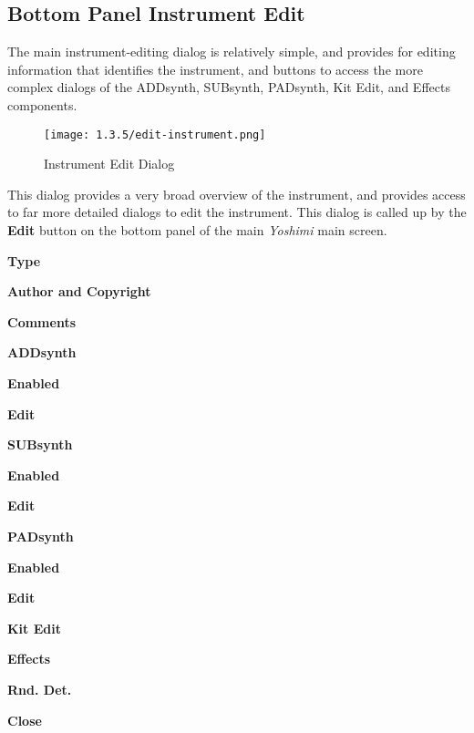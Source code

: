 \subsection{Bottom Panel Instrument Edit}
\label{subsec:bottom_panel_instrument_edit}

   The main instrument-editing dialog is relatively simple, and provides for
   editing information that identifies the instrument, and buttons to access
   the more complex dialogs of the ADDsynth, SUBsynth, PADsynth, Kit Edit,
   and Effects components.


\begin{figure}[H]
   \centering 
   \texttt{[image: 1.3.5/edit-instrument.png]}
   \caption{Instrument Edit Dialog}
   \label{fig:instrument_edit_dialog}
\end{figure}

   This dialog provides a very broad overview of the instrument, and
   provides access to far more detailed dialogs to edit the instrument.
   This dialog is called up by the \textbf{Edit} button on the bottom panel
   of the main \textsl{Yoshimi} main screen.

   \begin{enumber}
      \item \textbf{Type}
      \item \textbf{Author and Copyright}
      \item \textbf{Comments}
      \item \textbf{ADDsynth}
      \begin{enumber}
         \item \textbf{Enabled}
         \item \textbf{Edit}
      \end{enumber}
      \item \textbf{SUBsynth}
      \begin{enumber}
         \item \textbf{Enabled}
         \item \textbf{Edit}
      \end{enumber}
      \item \textbf{PADsynth}
      \begin{enumber}
         \item \textbf{Enabled}
         \item \textbf{Edit}
      \end{enumber}
      \item \textbf{Kit Edit}
      \item \textbf{Effects}
      \item \textbf{Rnd. Det.}
      \item \textbf{Close}
   \end{enumber}

